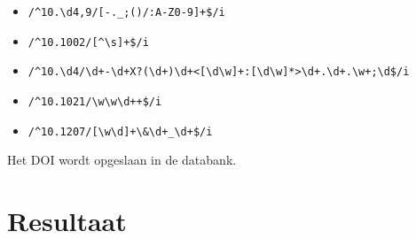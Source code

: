 \begin{itemize}
    \item \texttt{/\textasciicircum10.\textbackslash d{4,9}/[-.\_;()/:A-Z0-9]+\$/i}
    \item \texttt{/\textasciicircum10.1002/[\textasciicircum\textbackslash s]+\$/i}
    \item \texttt{/\textasciicircum10.\textbackslash d{4}/\textbackslash d+-\textbackslash d+X?(\textbackslash d+)\textbackslash d+<[\textbackslash d\textbackslash w]+:[\textbackslash d\textbackslash w]*>\textbackslash d+.\textbackslash d+.\textbackslash w+;\textbackslash d\$/i}
    \item \texttt{/\textasciicircum10.1021/\textbackslash w\textbackslash w\textbackslash d++\$/i}
    \item \texttt{/\textasciicircum10.1207/[\textbackslash w\textbackslash d]+\textbackslash \&\textbackslash d+\_\textbackslash d+\$/i}
\end{itemize}
Het DOI wordt opgeslaan in de databank.
\section{Resultaat}
